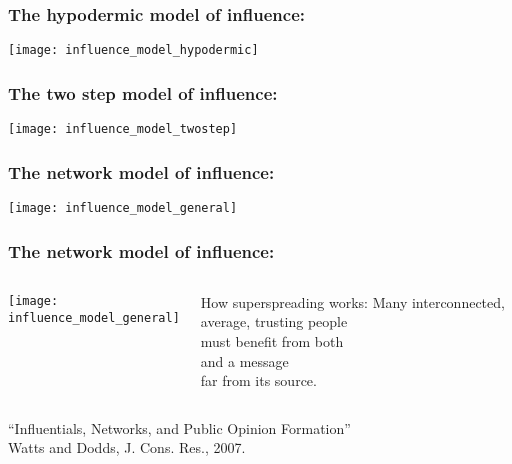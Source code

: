 \begin{frame}
  \frametitle{The hypodermic model of influence:}

  \begin{center}
    \texttt{[image: influence\_model\_hypodermic]}    
  \end{center}


\end{frame}

\begin{frame}
  \frametitle{The two step model of influence:\cite{katz1955a}}

  \begin{center}
    \texttt{[image: influence\_model\_twostep]}    
  \end{center}

\end{frame}

\begin{frame}
  \frametitle{The network model of influence:}

  \begin{center}
    \texttt{[image: influence\_model\_general]}    
  \end{center}

\end{frame}

\begin{frame}
  \frametitle{The network model of influence:}

  \begin{columns}
    \texttt{[image: influence\_model\_general]}    
    \begin{block}{How superspreading works:}
      Many interconnected, average, trusting people\\
      must benefit from both\\
       and  a message\\
      far from its source.
    \end{block}
  \end{columns}




  \bigskip
  \bigskip

  \small{
    ``Influentials, Networks, and Public Opinion Formation''\cite{watts2007a}\\
    Watts and Dodds, J. Cons. Res., 2007.
  }

\end{frame}

